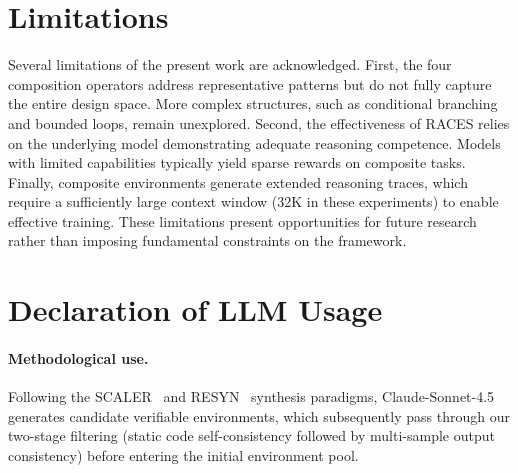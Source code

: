 %
%
\section{Limitations}
\label{sec:limitations}

Several limitations of the present work are acknowledged.
First, the four composition operators address representative patterns but do not fully capture the entire design space.
More complex structures, such as conditional branching and bounded loops, remain unexplored.
Second, the effectiveness of RACES relies on the underlying model demonstrating adequate reasoning competence. Models with limited capabilities typically yield sparse rewards on composite tasks. Finally, composite environments generate extended reasoning traces, which require a sufficiently large context window (32K in these experiments) to enable effective training.
These limitations present opportunities for future research rather than imposing fundamental constraints on the framework.


\section{Declaration of LLM Usage}
\label{sec:llm_declaration}

\paragraph{Methodological use.} Following the SCALER~\citep{xu2026scalersyntheticscalableadaptivelearning} and RESYN~\citep{he2026resyn} synthesis paradigms, Claude-Sonnet-4.5 generates candidate verifiable environments, which subsequently pass through our two-stage filtering (static code self-consistency followed by multi-sample output consistency) before entering the initial environment pool.
